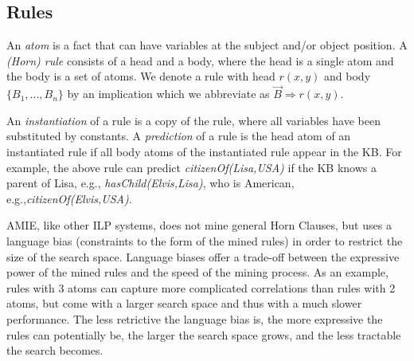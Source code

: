 \subsection{Rules}

      

An \emph{atom} is a fact that can have variables at the subject and/or object position.
A \emph{(Horn) rule} consists of a head and a body, where the head is a single atom and the body is a set of atoms.
We denote a rule with head $r(x,y)$ and body $\{B_1,..., B_n\}$ by an implication
which we abbreviate as $\vec{B} \Rightarrow r(x,y)$.

An \emph{instantiation} of a rule is a copy of the rule, where all variables have been substituted by constants.
A \emph{prediction} of a rule is the head atom of an instantiated rule if all body atoms of the instantiated rule appear in the KB.
For example, the above rule can predict \emph{citizenOf(Lisa,USA)} if the KB knows a parent of Lisa, e.g.,
\emph{hasChild(Elvis,Lisa)}, who is American, e.g.,\emph{citizenOf(Elvis,USA)}.

AMIE, like other ILP systems, does not mine general Horn Clauses, but uses a language bias (constraints to the form of the mined rules) 
in order to restrict the size of the search space. 
Language biases offer a trade-off between the expressive power of the mined rules and the speed of the mining process.
As an example, rules with 3 atoms can capture more complicated correlations than rules with 2 atoms, but come with a larger search space and thus with a much slower performance.
The less retrictive the language bias is,
the more expressive the rules can potentially be, the larger the search space grows, and the less tractable the search becomes.

